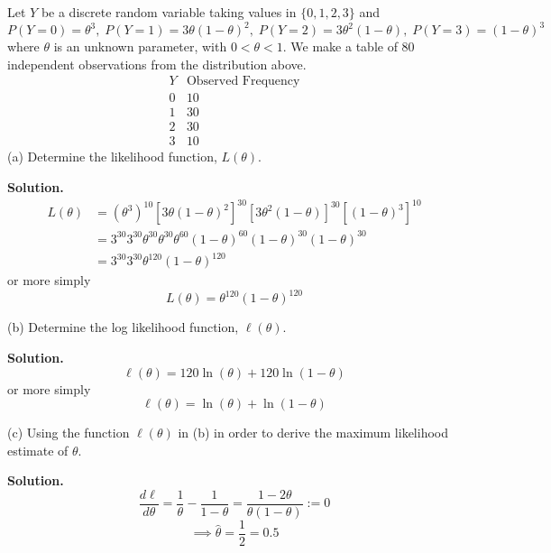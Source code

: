 \begin{exbox}
    \begin{example}
        Let $ Y $ be a discrete random variable taking values in $ \{0,1,2,3\} $ and
        \[ P(Y=0)=\theta^3,\; P(Y=1)=3\theta(1-\theta)^2,\;P(Y=2)=3\theta^2(1-\theta),\;
            P(Y=3)=(1-\theta)^3 \]
        where $ \theta $ is an unknown parameter, with $ 0<\theta<1 $.
        We make a table of $ 80 $ independent observations from the distribution above.
        \[
            \begin{array}{c|c}
                Y & \text{Observed Frequency} \\
                \hline
                0 & 10                        \\
                1 & 30                        \\
                2 & 30                        \\
                3 & 10
            \end{array}
        \]
        (a) Determine the likelihood function, $ L(\theta) $.
        
        \textbf{Solution.}
        \begin{align*}
            L(\theta)
             & =\left( \theta^3 \right)^{10}\left[ 3\theta(1-\theta)^2 \right]^{30}
            \left[ 3\theta^2(1-\theta) \right]^{30}\left[ (1-\theta)^3 \right]^{10}                        \\
             & =3^{30}3^{30}\theta^{30}\theta^{30}\theta^{60}(1-\theta)^{60}(1-\theta)^{30}(1-\theta)^{30} \\
             & =3^{30}3^{30}\theta^{120}(1-\theta)^{120}
        \end{align*}
        or more simply
        \[ L(\theta)=\theta^{120}(1-\theta)^{120} \]
        
        (b) Determine the log likelihood function, $ \ell(\theta) $.
        
        \textbf{Solution.}
        \[ \ell(\theta)=120\ln(\theta)+120\ln(1-\theta) \]
        or more simply
        \[ \ell(\theta)=\ln(\theta)+\ln(1-\theta) \]
        
        (c) Using the function $ \ell(\theta) $ in (b) in order to derive the maximum
        likelihood estimate of $ \theta $.
        
        \textbf{Solution.}
        \[ \frac{d\ell}{d\theta}=\frac{1}{\theta}-\frac{1}{1-\theta}=\frac{1-2\theta}{\theta(1-\theta)}:=0 \]
        \[ \implies \hat{\theta}=\frac{1}{2}=0.5 \]
    \end{example}
\end{exbox}

